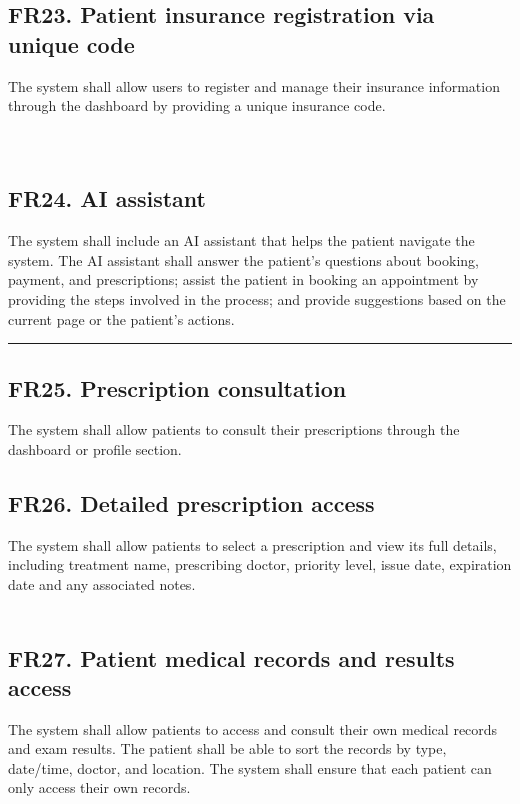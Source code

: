 \documentclass[12pt, a4paper]{article}
\begin{document}
\subsection{FR23. Patient insurance registration via unique code} \label{FR23}
The system shall allow users to register and manage their insurance information through the dashboard by providing a unique insurance code.
\\ 
\\ 
\\ 

\subsection{FR24. AI assistant} \label{FR24}
The system shall include an AI assistant that helps the patient navigate the system. The AI assistant shall answer the patient's questions about booking, payment, and prescriptions; assist the patient in booking an appointment by providing the steps involved in the process; and provide suggestions based on the current page or the patient's actions.
\\ 

\noindent\rule{\textwidth}{0.4pt}
\medskip

\subsection{FR25. Prescription consultation} \label{FR25}
The system shall allow patients to consult their prescriptions through the dashboard or profile section.
\\ 

\subsection{FR26. Detailed prescription access} \label{FR26}
The system shall allow patients to select a prescription and view its full details, including treatment name, prescribing doctor, priority level, issue date, expiration date and any associated notes.
\\ 
\\ 

\subsection{FR27. Patient medical records and results access} \label{FR27}
The system shall allow patients to access and consult their own medical records and exam results. The patient shall be able to sort the records by type, date/time, doctor, and location. The system shall ensure that each patient can only access their own records.
\\ 
\end{document}
